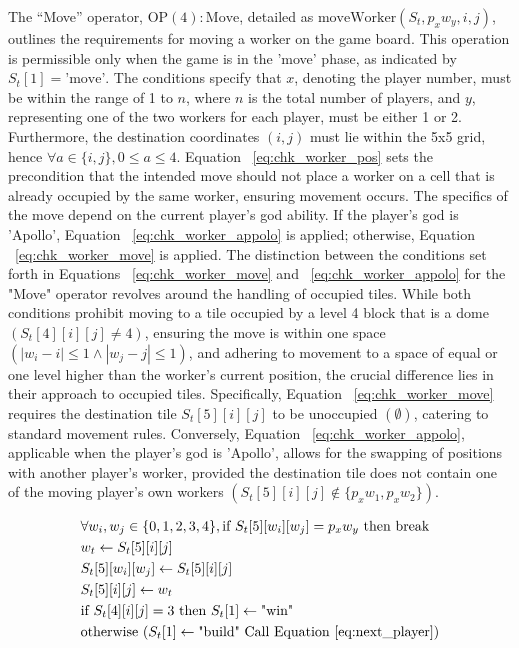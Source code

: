 \documentclass{telkomnika}
\begin{document}
The ``Move'' operator, \( \text{OP}(4):\text{Move} \), detailed as \( \text{moveWorker}(S_t, p_xw_y, i, j) \), outlines the requirements for moving a worker on the game board. This operation is permissible only when the game is in the 'move' phase, as indicated by \( S_t[1] = \text{'move'} \). The conditions specify that \( x \), denoting the player number, must be within the range of 1 to \( n \), where \( n \) is the total number of players, and \( y \), representing one of the two workers for each player, must be either 1 or 2. Furthermore, the destination coordinates \( (i, j) \) must lie within the 5x5 grid, hence \( \forall a \in \{i, j\}, 0 \leq a \leq 4 \). Equation ~\ref{eq:chk_worker_pos} sets the precondition that the intended move should not place a worker on a cell that is already occupied by the same worker, ensuring movement occurs. The specifics of the move depend on the current player's god ability. If the player's god is 'Apollo', Equation  ~\ref{eq:chk_worker_appolo} is applied; otherwise, Equation  ~\ref{eq:chk_worker_move} is applied. The distinction between the conditions set forth in Equations  ~\ref{eq:chk_worker_move} and ~\ref{eq:chk_worker_appolo} for the "Move" operator revolves around the handling of occupied tiles. While both conditions prohibit moving to a tile occupied by a level 4 block that is a dome \(( S_t[4][i][j] \neq 4 )\), ensuring the move is within one space \( (\left| w_i - i \right| \leq 1 \land \left| w_j - j \right| \leq 1 ) \), and adhering to movement to a space of equal or one level higher than the worker's current position, the crucial difference lies in their approach to occupied tiles. Specifically, Equation ~\ref{eq:chk_worker_move} requires the destination tile \( S_t[5][i][j] \) to be unoccupied \( (\emptyset) \), catering to standard movement rules. Conversely, Equation ~\ref{eq:chk_worker_appolo}, applicable when the player's god is 'Apollo', allows for the swapping of positions with another player's worker, provided the destination tile does not contain one of the moving player's own workers \( (S_t[5][i][j] \notin \{p_xw_1, p_xw_2\}) \).

\begin{equation}
 \begin{aligned}
    &\forall w_i, w_j \in \{0,1,2,3,4\},\text{if } S_t[5][w_i][w_j] = p_x w_y \text{ then break}\\
    &w_t \leftarrow S_t[5][i][j]\\
    &S_t[5][w_i][w_j]\leftarrow S_t[5][i][j]\\
    &S_t[5][i][j] \leftarrow w_t \\
    &\text{if } S_t[4][i][j]=3\text{ then } S_t[1] \leftarrow \text{"win"}\\
    &\text{otherwise } (S_t[1] \leftarrow \text{"build" Call Equation~\ref{eq:next_player}})
 \end{aligned}
\label{eq:worker_move}
\end{equation}
\end{document}
